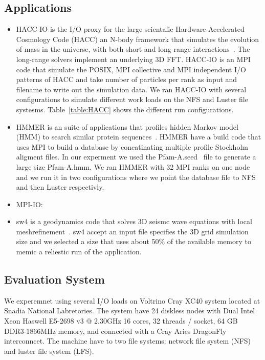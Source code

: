 \subsection{Applications}
\begin{itemize}
	\item HACC-IO is the I/O proxy for the large scientafic Hardware Accelerated Cosmology Code (HACC) an N-body framework that simulates the evolution of mass in the universe, with both short and long range interactions~\cite{habib2013hacc}. The long-range solvers implement an underlying 3D FFT. HACC-IO is an MPI code that simulate the POSIX, MPI collective and MPI independent I/O patterns of HACC and take number of particles per rank as input and filename to write out the simulation data. We ran HACC-IO with several configurations to simulate different work loads on the NFS and Luster file systesms. Table~\ref{table:HACC} shows the different run configurations. 
	\item HMMER is an suite of applications that profiles hidden Markov model (HMM) to search similar protein sequences~\cite{eddy1992hmmer}. HMMER have a build code that uses MPI to build a database by concatinating multiple profile Stockholm aligment files. In our experment we used the Pfam-A.seed~\cite{sonnhammer1998pfam} file to generate a large size Pfam-A.hmm. We ran HMMER with 32 MPI ranks on one node and we run it in two configurations where we point the database file to NFS and then Luster respectivly. 
	\item MPI-IO: 
	\item sw4 is a geodynamics code that solves 3D seismc wave equations with local meshrefinement~\cite{peterssonsw4}. sw4 accept an input file specifies the 3D grid simulation size and we selected a size that uses about 50\% of the available memory to memic a reliestic run of the application.
\end{itemize}

\subsection{Evaluation System}
We experemnet using several I/O loads on Voltrino Cray XC40 system located at Snadia National Labretories. The system have 24  diskless nodes with Dual Intel Xeon Haswell E5-2698 v3 @ 2.30GHz 16 cores, 32 threads / socket, 64 GB DDR3-1866MHz memory, and connceted with a Cray Aries DragonFly interconncet. The machine have to two file systems: network file system (NFS) and luster file system (LFS).

